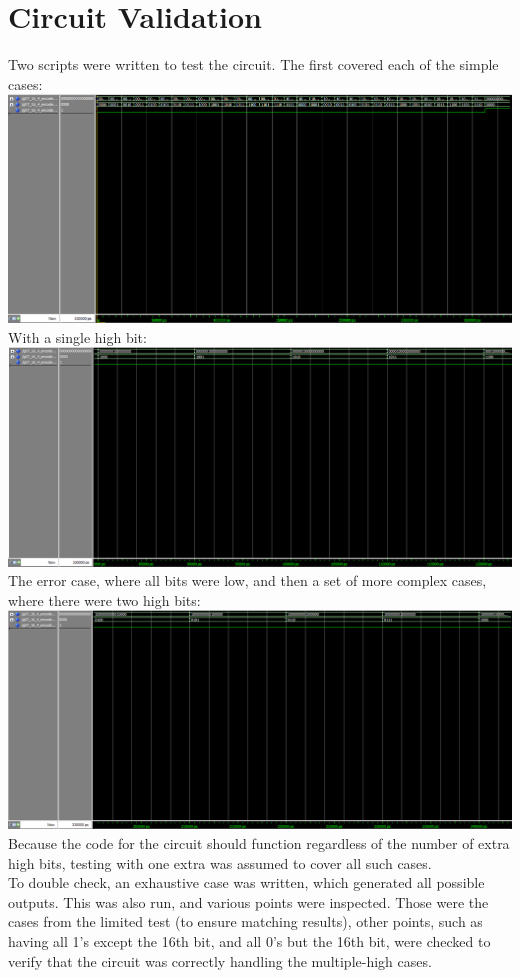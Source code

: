 \documentclass[Report1]{subfiles}
\begin{document}
\section{Circuit Validation}
Two scripts were written to test the circuit. The first covered each of the simple cases:\\
\includegraphics[width=\textwidth]{lab_1_full_16_test}
With a single high bit:\\
\includegraphics[width=\textwidth]{lab_1_simple_16_test}
The error case, where all bits were low, and then a set of more complex cases, where there were two high bits:\\
\includegraphics[width=\textwidth]{lab_1_multi_16_test}
Because the code for the circuit should function regardless of the number of extra high bits, testing with one extra was assumed to cover all such cases. \\
To double check, an exhaustive case was written, which generated all possible outputs. This was also run, and various points were inspected. Those were the cases from the limited test (to ensure matching results), other points, such as having all 1's except the 16th bit, and all 0's but the 16th bit, were checked to verify that the circuit was correctly handling the multiple-high cases. 
\end{document}
